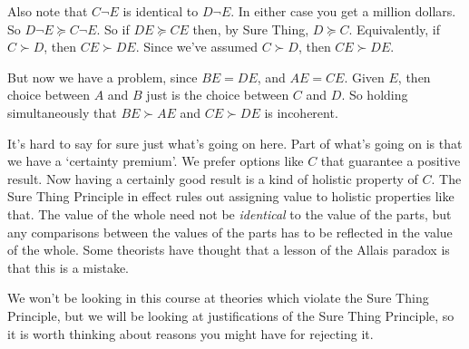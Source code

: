 Also note that $C \neg E$ is identical to $D \neg E$. In either case you get a million dollars. So $D \neg E \succeq C \neg E$. So if $DE \succeq CE$ then, by Sure Thing, $D \succeq C$. Equivalently, if $C \succ D$, then $CE \succ DE$. Since we've assumed $C \succ D$, then $CE \succ DE$.

But now we have a problem, since $BE = DE$, and $AE = CE$. Given $E$, then choice between $A$ and $B$ just is the choice between $C$ and $D$. So holding simultaneously that $BE \succ AE$ and $CE \succ DE$ is incoherent.

It's hard to say for sure just what's going on here. Part of what's going on is that we have a `certainty premium'. We prefer options like $C$ that guarantee a positive result. Now having a certainly good result is a kind of holistic property of $C$. The Sure Thing Principle in effect rules out assigning value to holistic properties like that. The value of the whole need not be \textit{identical} to the value of the parts, but any comparisons between the values of the parts has to be reflected in the value of the whole. Some theorists have thought that a lesson of the Allais paradox is that this is a mistake.

We won't be looking in this course at theories which violate the Sure Thing Principle, but we will be looking at justifications of the Sure Thing Principle, so it is worth thinking about reasons you might have for rejecting it.

